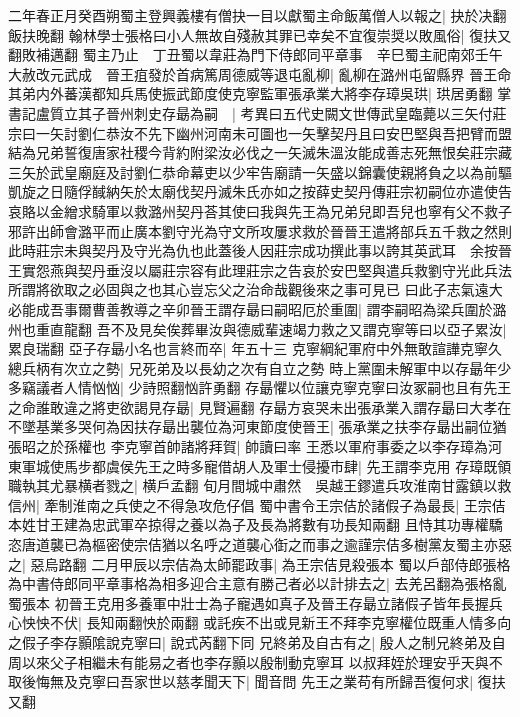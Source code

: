 二年春正月癸酉朔蜀主登興義樓有僧抉一目以獻蜀主命飯萬僧人以報之|{
	抉於决翻飯扶晚翻}
翰林學士張格曰小人無故自殘赦其罪已幸矣不宜復崇奨以敗風俗|{
	復扶又翻敗補邁翻}
蜀主乃止　丁丑蜀以韋莊為門下侍郎同平章事　辛巳蜀主祀南郊壬午大赦改元武成　晉王疽發於首病篤周德威等退屯亂柳|{
	亂柳在潞州屯留縣界}
晉王命其弟内外蕃漢都知兵馬使振武節度使克寧監軍張承業大將李存璋吳珙|{
	珙居勇翻}
掌書記盧質立其子晉州刺史存朂為嗣　|{
	考異曰五代史闕文世傳武皇臨薨以三矢付莊宗曰一矢討劉仁恭汝不先下幽州河南未可圖也一矢擊契丹且曰安巴堅與吾把臂而盟結為兄弟誓復唐家社稷今背約附梁汝必伐之一矢滅朱溫汝能成善志死無恨矣莊宗藏三矢於武皇廟庭及討劉仁恭命幕吏以少牢告廟請一矢盛以錦囊使親將負之以為前驅凱旋之日隨俘馘納矢於太廟伐契丹滅朱氏亦如之按薛史契丹傳莊宗初嗣位亦遣使告哀賂以金繒求騎軍以救潞州契丹荅其使曰我與先王為兄弟兒即吾兒也寧有父不救子邪許出師會潞平而止廣本劉守光為守文所攻屢求救於晉晉王遣將部兵五千救之然則此時莊宗未與契丹及守光為仇也此蓋後人因莊宗成功撰此事以誇其英武耳　余按晉王實怨燕與契丹垂沒以屬莊宗容有此理莊宗之告哀於安巴堅與遣兵救劉守光此兵法所謂將欲取之必固與之也其心豈忘父之治命哉觀後來之事可見已}
曰此子志氣遠大必能成吾事爾曹善教導之辛卯晉王謂存朂曰嗣昭厄於重圍|{
	謂李嗣昭為梁兵圍於潞州也重直龍翻}
吾不及見矣俟葬畢汝與德威輩速竭力救之又謂克寧等曰以亞子累汝|{
	累良瑞翻}
亞子存朂小名也言終而卒|{
	年五十三}
克寧綱紀軍府中外無敢諠譁克寧久總兵柄有次立之勢|{
	兄死弟及以長幼之次有自立之勢}
時上黨圍未解軍中以存朂年少多竊議者人情忷忷|{
	少詩照翻忷許勇翻}
存朂懼以位讓克寧克寧曰汝冢嗣也且有先王之命誰敢違之將吏欲謁見存朂|{
	見賢遍翻}
存朂方哀哭未出張承業入謂存朂曰大孝在不墜基業多哭何為因扶存朂出襲位為河東節度使晉王|{
	張承業之扶李存朂出嗣位猶張昭之於孫權也}
李克寧首帥諸將拜賀|{
	帥讀曰率}
王悉以軍府事委之以李存璋為河東軍城使馬步都虞侯先王之時多寵借胡人及軍士侵擾市肆|{
	先王謂李克用}
存璋既領職執其尤暴横者戮之|{
	横戶孟翻}
旬月間城中肅然　吳越王鏐遣兵攻淮南甘露鎮以救信州|{
	牽制淮南之兵使之不得急攻危仔倡}
蜀中書令王宗佶於諸假子為最長|{
	王宗佶本姓甘王建為忠武軍卒掠得之養以為子及長為將數有功長知兩翻}
且恃其功專權驕恣唐道襲已為樞密使宗佶猶以名呼之道襲心衘之而事之逾謹宗佶多樹黨友蜀主亦惡之|{
	惡烏路翻}
二月甲辰以宗佶為太師罷政事|{
	為王宗佶見殺張本}
蜀以戶部侍郎張格為中書侍郎同平章事格為相多迎合主意有勝己者必以計排去之|{
	去羌呂翻為張格亂蜀張本}
初晉王克用多養軍中壯士為子寵遇如真子及晉王存朂立諸假子皆年長握兵心怏怏不伏|{
	長知兩翻怏於兩翻}
或託疾不出或見新王不拜李克寧權位既重人情多向之假子李存顥隂說克寧曰|{
	說式芮翻下同}
兄終弟及自古有之|{
	殷人之制兄終弟及自周以來父子相繼未有能易之者也李存顥以殷制動克寧耳}
以叔拜姪於理安乎天與不取後悔無及克寧曰吾家世以慈孝聞天下|{
	聞音問}
先王之業苟有所歸吾復何求|{
	復扶又翻}
